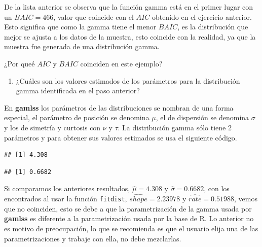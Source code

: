 \documentclass[10pt,]{krantz}
\makeatletter
\newenvironment{Shaded}{\begin{snugshade}}{\end{snugshade}}
\newcommand{\OperatorTok}[1]{\textcolor[rgb]{0.81,0.36,0.00}{\textbf{#1}}}
\newcommand{\NormalTok}[1]{#1}
\providecommand{\tightlist}{%
  \setlength{\itemsep}{0pt}\setlength{\parskip}{0pt}}
\let\proglang=\textsf
\newenvironment{kframe}{%
\medskip{}
\setlength{\fboxsep}{.8em}
 \def\at@end@of@kframe{}%
 \ifinner\ifhmode%
  \def\at@end@of@kframe{\end{minipage}}%
  \begin{minipage}{\columnwidth}%
 \fi\fi%
 \def\FrameCommand##1{\hskip\@totalleftmargin \hskip-\fboxsep
 \colorbox{shadecolor}{##1}\hskip-\fboxsep
     \hskip-\linewidth \hskip-\@totalleftmargin \hskip\columnwidth}%
 \MakeFramed {\advance\hsize-\width
   \@totalleftmargin\z@ \linewidth\hsize
   \@setminipage}}%
 {\par\unskip\endMakeFramed%
 \at@end@of@kframe}
\renewenvironment{Shaded}{\begin{kframe}}{\end{kframe}}
\makeatother
\begin{document}
De la lista anterior se observa que la función gamma está en el primer
lugar con un \(BAIC=466\), valor que coincide con el \(AIC\) obtenido en
el ejercicio anterior. Esto significa que como la gamma tiene el menor
\(BAIC\), es la distribución que mejor se ajusta a los datos de la
muestra, esto coincide con la realidad, ya que la muestra fue generada
de una distribución gamma.

¿Por queé \(AIC\) y \(BAIC\) coinciden en este ejemplo?

\begin{enumerate}
\def\labelenumi{\arabic{enumi})}
\setcounter{enumi}{1}
\tightlist
\item
  ¿Cuáles son los valores estimados de los parámetros para la
  distribución gamma identificada en el paso anterior?
\end{enumerate}

En \textbf{gamlss} los parámetros de las distribuciones se nombran de
una forma especial, el parámetro de posición se denomina \(\mu\), el de
dispersión se denomina \(\sigma\) y los de simetría y curtosis con
\(\nu\) y \(\tau\). La distribución gamma sólo tiene 2 parámetros y para
obtener sus valores estimados se usa el siguiente código.

\begin{Shaded}
\end{Shaded}

\begin{verbatim}
## [1] 4.308
\end{verbatim}

\begin{Shaded}
\end{Shaded}

\begin{verbatim}
## [1] 0.6682
\end{verbatim}

Si comparamos los anteriores resultados, \(\hat{\mu}= 4.308\) y
\(\hat{\sigma}=0.6682\), con los encontrados al usar la función
\texttt{fitdist}, \(\widehat{shape}=2.23978\) y
\(\widehat{rate}=0.51988\), vemos que no coinciden, esto se debe a que
la parametrización de la gamma usada por \textbf{gamlss} es diferente a
la parametrización usada por la base de \proglang{R}. Lo anterior no es
motivo de preocupación, lo que se recomienda es que el usuario elija una
de las parametrizaciones y trabaje con ella, no debe mezclarlas.
\end{document}
